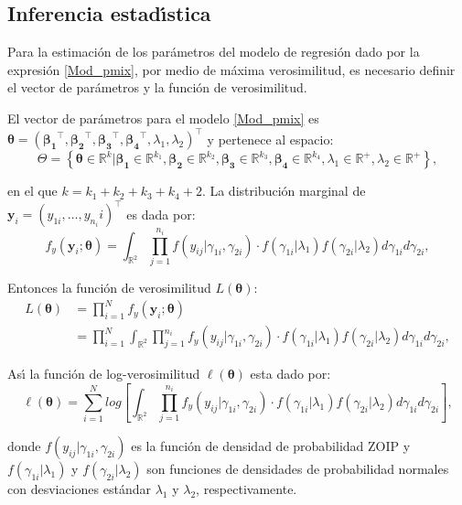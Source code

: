 \subsection{Inferencia estad\'{\i}stica}

Para la estimaci\'{o}n de los par\'{a}metros del modelo de regresi\'{o}n dado por la expresi\'{o}n \eqref{Mod_pmix}, por medio de m\'{a}xima verosimilitud, es necesario definir el vector de par\'{a}metros y la funci\'{o}n de verosimilitud.

El vector de par\'{a}metros para el modelo \eqref{Mod_pmix} es $\boldsymbol{\theta}=(\boldsymbol{\beta_1}^{\top},\boldsymbol{\beta_2}^{\top},\boldsymbol{\beta_3}^{\top}, \boldsymbol{\beta_4}^{\top},\lambda_1,\lambda_2)^{\top}$ y pertenece al espacio:
\[
\Theta=\left\{\boldsymbol{\theta} \in \mathbb{R}^k | \boldsymbol{\beta_1} \in \mathbb{R}^{k_1}, \boldsymbol{\beta_2} \in \mathbb{R}^{k_2}, \boldsymbol{\beta_3} \in \mathbb{R}^{k_3}, \boldsymbol{\beta_4} \in \mathbb{R}^{k_4}, \lambda_1 \in \mathbb{R}^+, \lambda_2 \in \mathbb{R}^+  \right\},
\]

en el que $k=k_1+k_2+k_3+k_4+2$. La distribuci\'{o}n marginal de $\mathbf{y}_i=(y_{1i},\ldots, y_{n_i}i)^{\top}$ es dada por:
\[
f_y(\mathbf{y}_i;\boldsymbol{\theta})=\int_{\mathbb{R}^2}\prod_{j=1}^{n_i}f(y_{ij}|\gamma_{1i},\gamma_{2i})\cdot f(\gamma_{1i}|\lambda_1) f(\gamma_{2i}|\lambda_2) d\gamma_{1i}d\gamma_{2i},
\]

Entonces la funci\'{o}n de verosimilitud $L(\boldsymbol{\theta})$:
\begin{align*}
L(\boldsymbol{\theta}) &= \prod_{i=1}^{N}f_y(\mathbf{y}_i;\boldsymbol{\theta})\\
&= \prod_{i=1}^{N}\int_{\mathbb{R}^2}\prod_{j=1}^{n_i}f_y(y_{ij}|\gamma_{1i},\gamma_{2i})\cdot f(\gamma_{1i}|\lambda_1) f(\gamma_{2i}|\lambda_2) d\gamma_{1i}d\gamma_{2i},
\end{align*}

As\'{\i} la funci\'{o}n de log-verosimilitud $\ell(\boldsymbol{\theta})$ esta dado por:
\begin{equation}
\ell(\boldsymbol{\theta})=\sum_{i=1}^{N}log \left[\int_{\mathbb{R}^2}\prod_{j=1}^{n_i}f_y(y_{ij}|\gamma_{1i},\gamma_{2i})\cdot f(\gamma_{1i}|\lambda_1) f(\gamma_{2i}|\lambda_2) d\gamma_{1i}d\gamma_{2i}\right],
 \label{func_ver_mix}
\end{equation}


donde $f(y_{ij}|\gamma_{1i},\gamma_{2i})$ es la funci\'{o}n de densidad de probabilidad ZOIP y $f(\gamma_{1i}|\lambda_1)$ y $f(\gamma_{2i}|\lambda_2)$ son funciones de densidades de probabilidad normales con desviaciones est\'{a}ndar $\lambda_1$ y $\lambda_2$, respectivamente.\\

